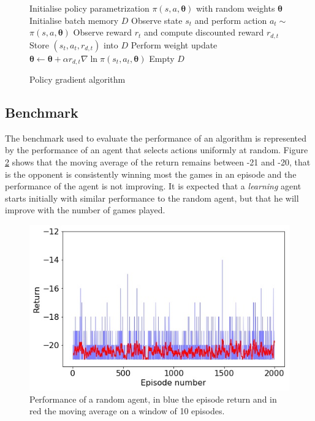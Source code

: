 \documentclass[a4paper, 11pt]{article}
\renewenvironment{algorithmic}[1][0]{%
  \hrulefill\par
  \oldalgorithmic[#1]}
  {\endoldalgorithmic\par
   \vspace*{-.5\baselineskip}
   \hrulefill\par
  }
\begin{document}
\begin{figure}[!htb]
  \begin{algorithmic}
    \State Initialise policy parametrization $\pi(s,a,\boldsymbol{\theta})$ with random weights $\boldsymbol{\theta}$
    \State Initialise batch memory $D$
    		\Repeat
    			\State Observe state $s_t$ and perform action $a_t \sim$ $\pi(s,a,\mathbf{\theta})$
    			\State Observe reward $r_t $ and compute discounted reward $r_{d,t}$
    			\State Store $(s_t, a_t, r_{d,t})$ into $D$
    			\State Perform weight update $\boldsymbol{\theta} \gets \boldsymbol{\theta} + \alpha r_{d,t} \nabla \ln \pi(s_t,a_t,\mathbf{\theta})$
    			\State Empty $D$
    		\EndIf
    	\EndFor
  \end{algorithmic}
    \caption{Policy gradient algorithm}\label{fig:PG_algorithm}
\end{figure}

\subsection{Benchmark}
The benchmark used to evaluate the performance of an algorithm is represented by the performance of an agent that selects actions uniformly at random. Figure \ref{fig:random-agent} shows that the moving average of the return remains between -21 and -20, that is the opponent is consistently winning most the games in an episode and the performance of the agent is not improving. It is expected that a \emph{learning} agent starts initially with similar performance to the random agent, but that he will improve with the number of games played.
\begin{figure}[!htb]
  \begin{center}
   \includegraphics[width=0.4\textheight]{random_return.jpeg}
    \caption{Performance of a random agent, in blue the episode return and in red the moving average on a window of 10 episodes.}
    \label{fig:random-agent}
  \end{center}
\end{figure}  
\end{document}
